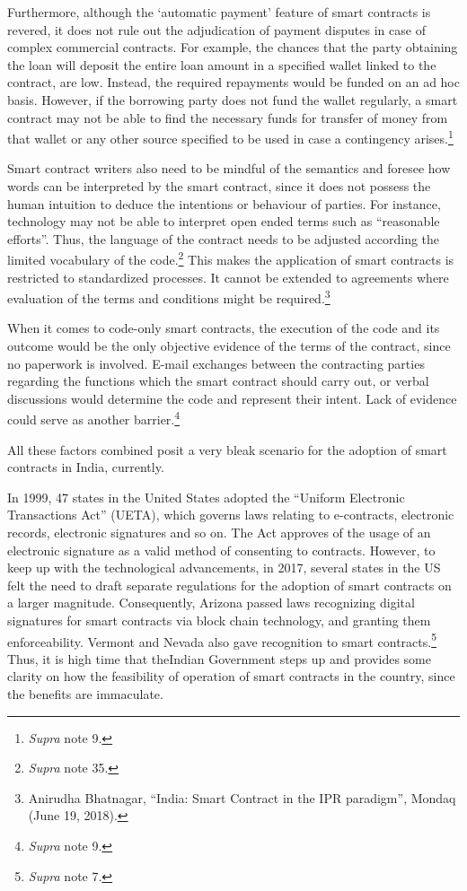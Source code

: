 \begin{multicols}{2}
\noi
Furthermore, although the ‘automatic payment’ feature of smart contracts is revered, it does
not rule out the adjudication of payment disputes in case of complex commercial contracts.
For example, the chances that the party obtaining the loan will deposit the entire loan amount
in a specified wallet linked to the contract, are low. Instead, the required repayments would
be funded on an ad hoc basis. However, if the borrowing party does not fund the wallet
regularly, a smart contract may not be able to find the necessary funds for transfer of money
from that wallet or any other source specified to be used in case a contingency arises.\footnote{\textit{Supra} note 9.}

\noi
Smart contract writers also need to be mindful of the semantics and foresee how words can be
interpreted by the smart contract, since it does not possess the human intuition to deduce the
intentions or behaviour of parties. For instance, technology may not be able to interpret open
ended terms such as “reasonable efforts”. Thus, the language of the contract needs to be
adjusted according the limited vocabulary of the code.\footnote{\textit{Supra} note 35.} This makes the application of smart contracts is restricted to standardized processes. It cannot be extended to agreements where
evaluation of the terms and conditions might be required.\footnote{Anirudha Bhatnagar, “India: Smart Contract in the IPR paradigm”, Mondaq (June 19, 2018). }

\noi
When it comes to code-only smart contracts, the execution of the code and its outcome would
be the only objective evidence of the terms of the contract, since no paperwork is involved.
E-mail exchanges between the contracting parties regarding the functions which the smart
contract should carry out, or verbal discussions would determine the code and represent their
intent. Lack of evidence could serve as another barrier.\footnote{\textit{Supra} note 9.}

\noi
All these factors combined posit a very bleak scenario for the adoption of smart contracts in
India, currently. 


\noi
In 1999, 47 states in the United States adopted the “Uniform Electronic Transactions Act”
(UETA), which governs laws relating to e-contracts, electronic records, electronic signatures
and so on. The Act approves of the usage of an electronic signature as a valid method of
consenting to contracts. However, to keep up with the technological advancements, in 2017,
several states in the US felt the need to draft separate regulations for the adoption of smart
contracts on a larger magnitude. Consequently, Arizona passed laws recognizing digital
signatures for smart contracts via block chain technology, and granting them enforceability.
Vermont and Nevada also gave recognition to smart contracts.\footnote{\textit{Supra} note 7.} Thus, it is high time that the\break Indian Government steps up and provides some clarity on how the feasibility of operation of
smart contracts in the country, since the benefits are immaculate. 


\end{multicols}
